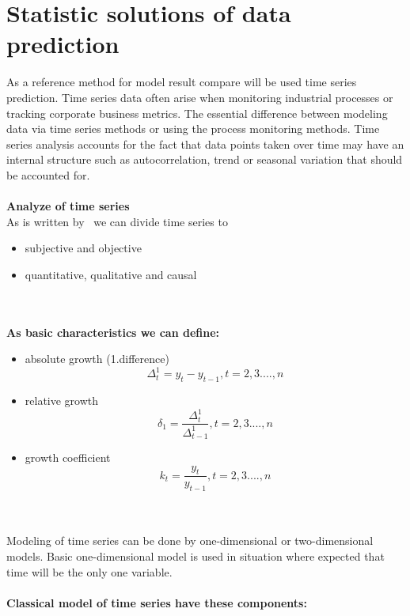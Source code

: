 \section{Statistic solutions of data prediction} \label{sec:statistics}
As a reference method for model result compare will be used time series prediction.
Time series data often arise when monitoring industrial processes or tracking corporate business metrics.
The essential difference between modeling data via time series methods or using the process monitoring methods.
Time series analysis accounts for the fact that data points taken over time may have an internal structure such as autocorrelation,
trend or seasonal variation that should be accounted for.\\
\\
\textbf{Analyze of time series} \label{subsec:statistics_analyze}\\
As is written by~\cite{benkova} we can divide time series to
\begin{itemize}
	\item subjective and objective
	\item quantitative, qualitative and causal
\end{itemize}\\
\\
\textbf{As basic characteristics we can define:}
\begin{itemize}
	\item absolute growth (1.difference)
	\begin{equation} \label{eq:18}
	\Delta_t^1 = y_t - y_{t-1}, t = 2,3 ....,n
	\end{equation}
	\item relative growth
	\begin{equation} \label{eq:19}
	\delta_1 = \frac{\Delta_t^1}{\Delta_{t-1}^1}, t = 2,3 ....,n
	\end{equation}
	\item growth coefficient
	\begin{equation} \label{eq:20}
	k_t = \frac{y_t}{y_{t-1}}, t = 2,3 ....,n
	\end{equation}
\end{itemize}\\
\\
Modeling of time series can be done by one-dimensional or two-dimensional models.
Basic one-dimensional model is used in situation where expected that time will be the only one variable.\\
\\
\textbf{Classical model of time series have these components:}
